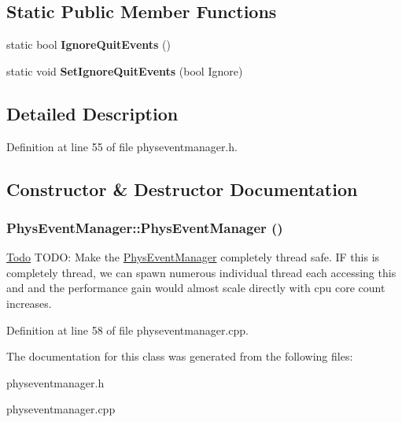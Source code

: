 \subsection*{Static Public Member Functions}
\begin{DoxyCompactItemize}
\item 
\hypertarget{classPhysEventManager_a9783a16342acd71c9a11ade41a2e226b}{
static bool {\bfseries IgnoreQuitEvents} ()}
\label{d5/dd7/classPhysEventManager_a9783a16342acd71c9a11ade41a2e226b}

\item 
\hypertarget{classPhysEventManager_acc902586015a3cd903d14cb20cd51386}{
static void {\bfseries SetIgnoreQuitEvents} (bool Ignore)}
\label{d5/dd7/classPhysEventManager_acc902586015a3cd903d14cb20cd51386}

\end{DoxyCompactItemize}


\subsection{Detailed Description}


Definition at line 55 of file physeventmanager.h.

\subsection{Constructor \& Destructor Documentation}
\hypertarget{classPhysEventManager_a217e7f6006aaf5e08e2872fa4d66e5e2}{
\subsubsection[{PhysEventManager}]{\setlength{\rightskip}{0pt plus 5cm}PhysEventManager::PhysEventManager ()}}
\label{d5/dd7/classPhysEventManager_a217e7f6006aaf5e08e2872fa4d66e5e2}
\begin{Desc}
\item[\hyperlink{todo__todo000002}{Todo}]TODO: Make the \hyperlink{classPhysEventManager}{PhysEventManager} completely thread safe. IF this is completely thread, we can spawn numerous individual thread each accessing this and and the performance gain would almost scale directly with cpu core count increases. \end{Desc}


Definition at line 58 of file physeventmanager.cpp.

The documentation for this class was generated from the following files:\begin{DoxyCompactItemize}
\item 
physeventmanager.h\item 
physeventmanager.cpp\end{DoxyCompactItemize}
